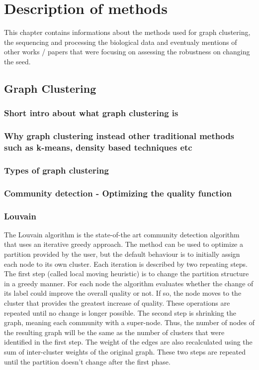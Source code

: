 \chapter{Description of methods}

This chapter contains informations about the methods used for graph clustering, the sequencing and processing the biological data and eventualy mentions of other works / papers that were focusing on assessing the robustness on changing the seed.

\section{Graph Clustering}

\subsection{Short intro about what graph clustering is}

\subsection{Why graph clustering instead other traditional methods such as k-means, density based techniques etc}

\subsection{Types of graph clustering}

\subsection{Community detection - Optimizing the quality function}

\subsection{Louvain}
The Louvain algorithm \cite{Blondel2008b} is the state-of-the art community detection algorithm that uses an iterative greedy approach. The method can be used to optimize a partition provided by the user, but the default behaviour is to initially assign each node to its own cluster.
Each iteration is described by two repeating steps. The first step (called local moving heuristic) is to change the partition structure in a greedy manner. For each node the algorithm evaluates whether the change of its label could improve the overall quality or not. If so, the node moves to the cluster that provides the greatest increase of quality. These operations are repeated until no change is longer possible. The second step is shrinking the graph, meaning each community with a super-node. Thus, the number of nodes of the resulting graph will be the same as the number of clusters that were identified in the first step. The weight of the edges are also recalculated using the sum of inter-cluster weights of the original graph.
These two steps are repeated until the partition doesn't change after the first phase.

